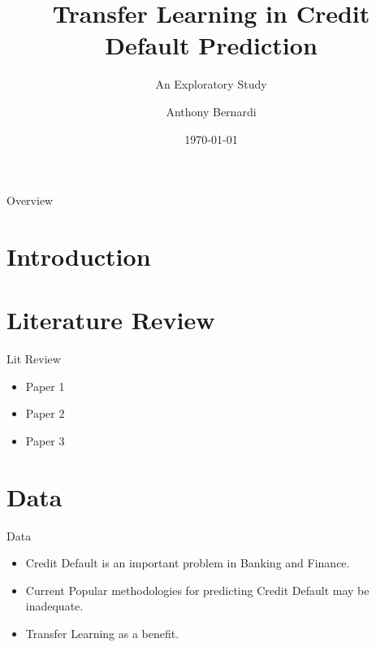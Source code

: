 \documentclass{beamer}
\title{Transfer Learning in Credit Default Prediction}
\subtitle{An Exploratory Study}
\author{Anthony Bernardi}
\institute{University of Kentucky - Department of Statistics}
\date{\today}
\begin{document}
\begin{frame}
   \titlepage 
\end{frame}

\begin{frame}{Overview} 
  \tableofcontents
\end{frame} 


\section{Introduction}





\section{Literature Review}

\begin{frame}{Lit Review}
  \begin{itemize}
    \item Paper 1 
    \item Paper 2 
    \item Paper 3
  \end{itemize}
\end{frame}


\section{Data}

\begin{frame}{Data}
  \begin{itemize}
    \item Credit Default is an important problem in Banking and Finance.
    \item Current Popular methodologies for predicting Credit Default may be inadequate.
    \item Transfer Learning as a benefit.
  \end{itemize}

\end{frame}
\end{document}

